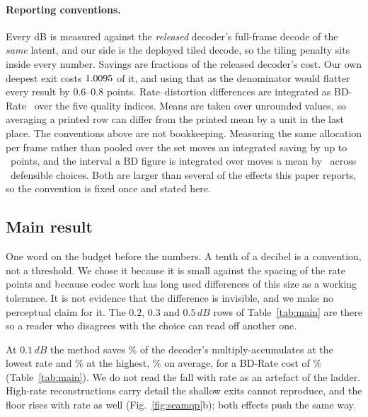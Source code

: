 \documentclass[10pt,twocolumn,letterpaper]{article}
\newcommand{\dB}{\,dB}
\begin{document}
\paragraph{Reporting conventions.} Every dB is measured against the
\emph{released} decoder's full-frame decode of the \emph{same} latent, and our
side is the deployed tiled decode, so the tiling penalty sits inside every
number. Savings are fractions of the released decoder's cost. Our own deepest
exit costs $1.0095$ of it, and using that as the denominator would flatter every
result by $0.6$--$0.8$ points. Rate--distortion differences are integrated as
BD-Rate~\cite{bjontegaard} over the five quality indices. Means are taken over unrounded values, so
averaging a printed row can differ from the printed mean by a unit in the last
place.
The conventions above are not bookkeeping. Measuring the same allocation per
frame rather than pooled over the set moves an integrated saving by up to
\ConvPooledMax\ points, and the interval a BD figure is integrated over moves a
mean by \ConvIntervalRange\ across \ConvIntervalN\ defensible choices. Both are
larger than several of the effects this paper reports, so the convention is
fixed once and stated here.

\subsection{Main result}

\begin{table}[t]
\centering

\caption{\textbf{Decoder MACs saved} (\%) against the released decoder, per
quality index and distortion budget, configuration A. The $0.3$ and $0.5\dB$ rows
sit on the architectural ceiling of Eq.~(\ref{eq:ceiling}) almost everywhere;
past that point a looser budget buys nothing.}
\label{tab:main}
\end{table}

One word on the budget before the numbers. A tenth of a decibel is a convention, not a
threshold. We chose it because it is small against the spacing of the
rate points and because codec work has long used differences of this size as a
working tolerance. It is not evidence that the difference is invisible, and we
make no perceptual claim for it. The $0.2$, $0.3$ and $0.5\dB$ rows of
Table~\ref{tab:main} are there so a reader who disagrees with the choice can
read off another one.

At $0.1\dB$ the method saves \MainLowRate\% of the decoder's
multiply-accumulates at the lowest rate and \MainHighRate\% at the highest,
\MainMean\% on average, for a BD-Rate cost of \BdRateALow\%
(Table~\ref{tab:main}). We do not read the fall with rate as an artefact of the
ladder. High-rate reconstructions carry detail the shallow exits cannot
reproduce, and the floor rises with rate as well (Fig.~\ref{fig:seamqp}b); both
effects push the same way.
\end{document}
